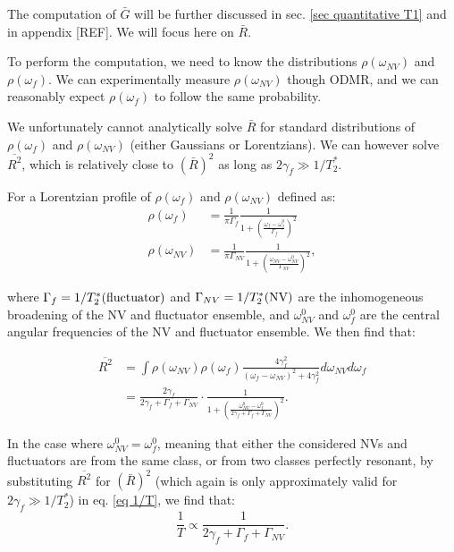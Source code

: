 \documentclass[a4paper,11pt]{report}
\begin{document}
The computation of $\bar G$ will be further discussed in sec. \ref{sec quantitative T1} and in appendix [REF]. We will focus here on $\bar R$.

To perform the computation, we need to know the distributions $\rho(\omega_{NV})$ and $\rho(\omega_{f})$. We can experimentally measure $\rho(\omega_{NV})$ though ODMR, and we can reasonably expect $\rho(\omega_{f})$ to follow the same probability.

We unfortunately cannot analytically solve $\bar R$ for standard distributions of $\rho(\omega_{f})$ and $\rho(\omega_{NV})$ (either Gaussians or Lorentzians). We can however solve $\overline{R^2}$, which is relatively close to $(\bar{R})^2$ as long as $2 \gamma_f \gg 1/T_2^*$.

For a Lorentzian profile of $\rho(\omega_{f})$ and $\rho(\omega_{NV})$ defined as:
\begin{align*}
\rho(\omega_{f})&=\frac{1}{\pi \Gamma_f} \frac{1}{1+ \left(\frac{\omega_f-\omega^0_f}{\Gamma_f}\right)^2} \\
\rho(\omega_{NV})&=\frac{1}{\pi \Gamma_{NV}} \frac{1}{1+ \left(\frac{\omega_{NV}-\omega^0_{NV}}{\Gamma_{NV}}\right)^2},
\end{align*}

where $\Gamma_{f}=1/T_2^*(\rm fluctuator)$ and $\Gamma_{NV}=1/T_2^*(\rm NV)$ are the inhomogeneous broadening of the NV and fluctuator ensemble, and $\omega^0_{NV}$ and $\omega^0_{f}$ are the central angular frequencies of the NV and fluctuator ensemble. We then find that:

\begin{align*}
\overline{R^2}&= \int \rho(\omega_{NV}) \rho(\omega_{f}) \frac{4\gamma_f^2}{(\omega_f - \omega_{NV})^2+4\gamma_f^2} d\omega_{NV} d\omega_{f} \\
&=\frac{2 \gamma_f}{2 \gamma_f + \Gamma_f + \Gamma_{NV}} \cdot \frac{1}{1+\left(\frac{\omega^0_{NV}-\omega^0_{f}}{2 \gamma_f + \Gamma_f + \Gamma_{NV}}\right)^2}.
\end{align*}

In the case where $\omega^0_{NV}=\omega^0_{f}$, meaning that either the considered NVs and fluctuators are from the same class, or from two classes perfectly resonant, by substituting $\overline{R ^2}$ for $(\bar{R})^2$ (which again is only approximately valid for $2 \gamma_f \gg 1/T_2^*$) in eq. \ref{eq 1/T}, we find that:
\begin{equation}
\label{eq 1/T avec T2*}
\frac{1}{T} \propto \frac{1}{2\gamma_f + \Gamma_f + \Gamma_{NV}}.
\end{equation}
\end{document}
